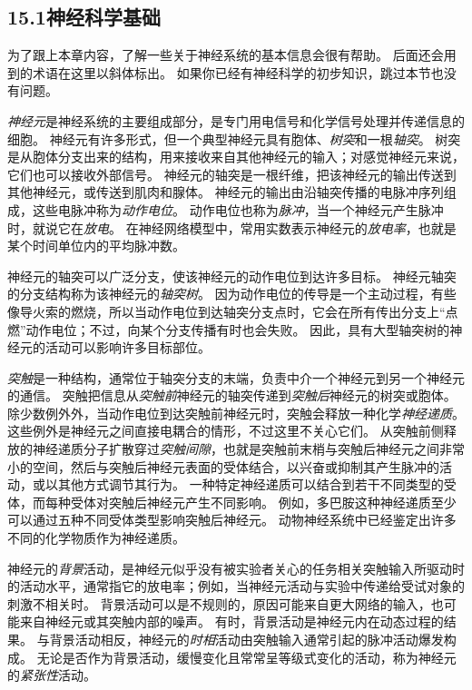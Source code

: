 \documentclass[UTF8,12pt,a4paper,fontset=fandol]{ctexart}
\begin{document}
\subsection*{15.1\quad 神经科学基础}

为了跟上本章内容，了解一些关于神经系统的基本信息会很有帮助。
后面还会用到的术语在这里以斜体标出。
如果你已经有神经科学的初步知识，跳过本节也没有问题。

\textit{神经元}是神经系统的主要组成部分，是专门用电信号和化学信号处理并传递信息的细胞。
神经元有许多形式，但一个典型神经元具有胞体、\textit{树突}和一根\textit{轴突}。
树突是从胞体分支出来的结构，用来接收来自其他神经元的输入；对感觉神经元来说，它们也可以接收外部信号。
神经元的轴突是一根纤维，把该神经元的输出传送到其他神经元，或传送到肌肉和腺体。
神经元的输出由沿轴突传播的电脉冲序列组成，这些电脉冲称为\textit{动作电位}。
动作电位也称为\textit{脉冲}，当一个神经元产生脉冲时，就说它在\textit{放电}。
在神经网络模型中，常用实数表示神经元的\textit{放电率}，也就是某个时间单位内的平均脉冲数。

神经元的轴突可以广泛分支，使该神经元的动作电位到达许多目标。
神经元轴突的分支结构称为该神经元的\textit{轴突树}。
因为动作电位的传导是一个主动过程，有些像导火索的燃烧，所以当动作电位到达轴突分支点时，它会在所有传出分支上“点燃”动作电位；不过，向某个分支传播有时也会失败。
因此，具有大型轴突树的神经元的活动可以影响许多目标部位。

\textit{突触}是一种结构，通常位于轴突分支的末端，负责中介一个神经元到另一个神经元的通信。
突触把信息从\textit{突触前}神经元的轴突传递到\textit{突触后}神经元的树突或胞体。
除少数例外外，当动作电位到达突触前神经元时，突触会释放一种化学\textit{神经递质}。
这些例外是神经元之间直接电耦合的情形，不过这里不关心它们。
从突触前侧释放的神经递质分子扩散穿过\textit{突触间隙}，也就是突触前末梢与突触后神经元之间非常小的空间，然后与突触后神经元表面的受体结合，以兴奋或抑制其产生脉冲的活动，或以其他方式调节其行为。
一种特定神经递质可以结合到若干不同类型的受体，而每种受体对突触后神经元产生不同影响。
例如，多巴胺这种神经递质至少可以通过五种不同受体类型影响突触后神经元。
动物神经系统中已经鉴定出许多不同的化学物质作为神经递质。

神经元的\textit{背景}活动，是神经元似乎没有被实验者关心的任务相关突触输入所驱动时的活动水平，通常指它的放电率；例如，当神经元活动与实验中传递给受试对象的刺激不相关时。
背景活动可以是不规则的，原因可能来自更大网络的输入，也可能来自神经元或其突触内部的噪声。
有时，背景活动是神经元内在动态过程的结果。
与背景活动相反，神经元的\textit{时相}活动由突触输入通常引起的脉冲活动爆发构成。
无论是否作为背景活动，缓慢变化且常常呈等级式变化的活动，称为神经元的\textit{紧张性}活动。
\end{document}
